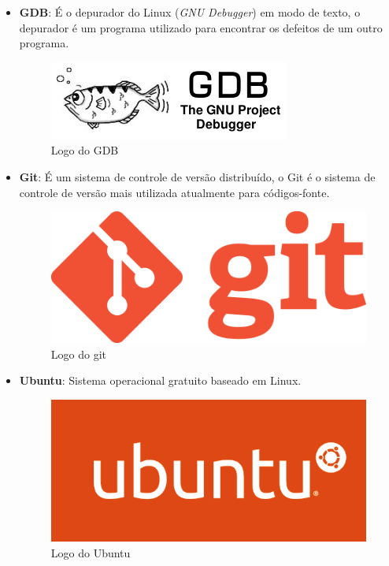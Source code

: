 \documentclass[11pt]{article} %
\begin{document}
\begin{itemize}
\item \textbf{GDB}: É o depurador do Linux (\textit{GNU Debugger}) em modo de texto, o depurador é um programa utilizado para encontrar os defeitos de um outro programa.

\begin{figure}[!htp]
\centering
\includegraphics[scale=0.3]{res/GDB.png}
\caption{Logo do GDB}
\label{Logo do GDB}
\end{figure}

\item \textbf{Git}: É um sistema de controle de versão distribuído, o Git é o sistema de controle de versão mais utilizada atualmente para códigos-fonte.
\begin{figure}[!htp]
\centering
\includegraphics[scale=0.1]{res/git.png}
\caption{Logo do git}
\label{Logo do git}
\end{figure}

\item \textbf{Ubuntu}: Sistema operacional gratuito baseado em Linux.

\begin{figure}[!htp]
\centering
\includegraphics[scale=0.2]{res/ubuntu.png}
\caption{Logo do Ubuntu}
\label{Logo do Ubuntu}
\end{figure}


\end{itemize}
\end{document}
